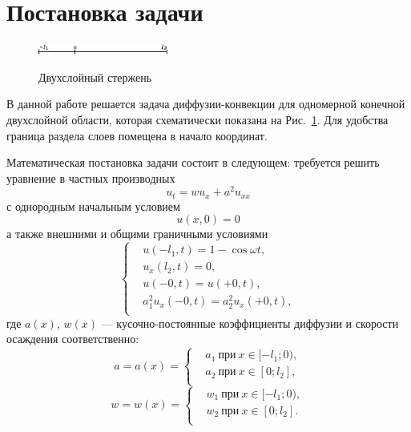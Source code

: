 \documentclass[12pt, a4paper]{article}
\begin{document}
\section{Постановка задачи}
\begin{figure}
  \centering
  \label{fig:1}
  \includegraphics[width=0.38\textwidth]{fig1.eps}
  \\
  \caption{Двухслойный стержень}
\end{figure}
В данной работе решается задача диффузии-конвекции для одномерной конечной двухслойной области, которая схематически показана на Рис.~\ref{fig:1}. Для удобства граница раздела слоев помещена в начало координат.

Математическая постановка задачи состоит в следующем: требуется решить уравнение в частных производных
\begin{equation}
 u_t = wu_x + a^2 u_{xx} 
 \label{eq:12}
\end{equation}
с однородным начальным условием
\begin{equation}
 u(x,0) = 0 
\end{equation}
а также внешними и общими граничными условиями 
\begin{equation}
  \left\{
  \begin{aligned}
    & u(-l_1,t) = 1 - \cos \omega t, \\
    & u_x(l_2,t) = 0, \\
    & u(-0, t) = u(+0, t), \\
    & a_1^2 u_{x}(-0, t) = a_2^2 u_{x}(+0, t), \\
  \end{aligned}
  \right.
\end{equation}
где $a(x)$, $w(x)$ --- кусочно-постоянные коэффициенты диффузии и скорости осаждения соответственно:
\begin{equation}
  a=a(x)=\left\{ 
    \begin{aligned}
      & a_1\ \text{при}\ x \in [-l_1;0), \\
      & a_2\ \text{при}\ x \in [0;l_2], \\
    \end{aligned}
\right.
\end{equation}
\begin{equation}
  w=w(x)=\left\{ 
    \begin{aligned}
      & w_1\ \text{при}\ x \in [-l_1;0), \\
      & w_2\ \text{при}\ x \in [0;l_2]. \\
    \end{aligned}
\right.
\end{equation}
\end{document}
